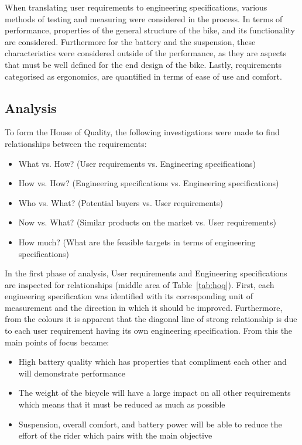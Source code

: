 \documentclass[a4paper,11pt]{article}
\begin{document}
\newpage

When translating user requirements to engineering specifications, various methods of testing and measuring were considered in the process. In terms of performance, properties of the general structure of the bike, and its functionality are considered. Furthermore for the battery and the suspension, these characteristics were considered outside of the performance, as they are aspects that must be well defined for the end design of the bike. Lastly, requirements categorised as ergonomics, are quantified in terms of ease of use and comfort.

\subsection{Analysis}

To form the House of Quality, the following investigations were made to find relationships between the requirements:
\begin{itemize}
	\setlength{\itemsep}{0pt}
	\item What vs. How? (User requirements vs. Engineering specifications)
	\item How vs. How? (Engineering specifications vs. Engineering specifications)
	\item Who vs. What? (Potential buyers vs. User requirements)
	\item Now vs. What? (Similar products on the market vs. User requirements)
	\item How much? (What are the feasible targets in terms of engineering specifications)
\end{itemize}

In the first phase of analysis, User requirements and Engineering specifications are inspected for relationships (middle area of Table~\ref{tab:hoq}). First, each engineering specification was identified with its corresponding unit of measurement and the direction in which it should be improved. Furthermore, from the colours it is apparent that the diagonal line of strong relationship is due to each user requirement having its own engineering specification. From this the main points of focus became:
\begin{itemize}
	\setlength{\itemsep}{0pt}
	\item High battery quality which has properties that compliment each other and will demonstrate performance
	\item The weight of the bicycle will have a large impact on all other requirements which means that it must be reduced as much as possible
	\item Suspension, overall comfort, and battery power will be able to reduce the effort of the rider which pairs with the main objective
\end{itemize}
\end{document}
